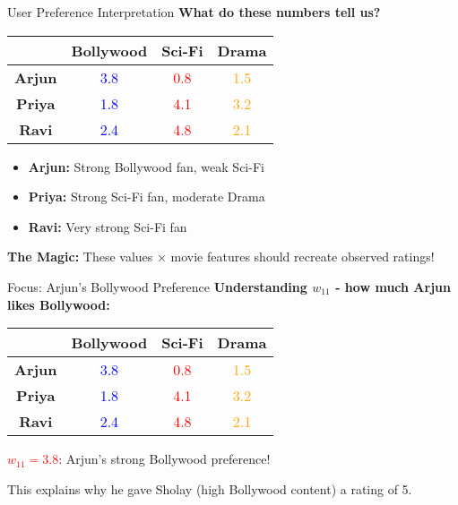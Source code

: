 \documentclass{beamer}
\begin{document}
\begin{frame}{User Preference Interpretation}
\textbf{What do these numbers tell us?}

\pause
\begin{center}
\renewcommand{\arraystretch}{1.6}
\begin{tabular}{c|ccc}
 & \textbf{Bollywood} & \textbf{Sci-Fi} & \textbf{Drama} \\
\hline
\textbf{Arjun} & \textcolor{blue}{3.8} & \textcolor{red}{0.8} & \textcolor{orange}{1.5} \\
\textbf{Priya} & \textcolor{blue}{1.8} & \textcolor{red}{4.1} & \textcolor{orange}{3.2} \\
\textbf{Ravi} & \textcolor{blue}{2.4} & \textcolor{red}{4.8} & \textcolor{orange}{2.1}
\end{tabular}
\end{center}

\pause
\begin{itemize}[<+->]
    \item \textbf{Arjun:} Strong Bollywood fan, weak Sci-Fi
    \item \textbf{Priya:} Strong Sci-Fi fan, moderate Drama
    \item \textbf{Ravi:} Very strong Sci-Fi fan
\end{itemize}

\pause
\textbf{The Magic:} These values × movie features should recreate observed ratings!
\end{frame}

\begin{frame}{Focus: Arjun's Bollywood Preference}
\textbf{Understanding $w_{11}$ - how much Arjun likes Bollywood:}

\pause
\begin{center}
\renewcommand{\arraystretch}{1.6}
\begin{tabular}{c|ccc}
 & \textbf{Bollywood} & \textbf{Sci-Fi} & \textbf{Drama} \\
\hline
\textbf{Arjun} & \cellcolor{red!50}\textcolor{blue}{3.8} & \textcolor{red}{0.8} & \textcolor{orange}{1.5} \\
\textbf{Priya} & \textcolor{blue}{1.8} & \textcolor{red}{4.1} & \textcolor{orange}{3.2} \\
\textbf{Ravi} & \textcolor{blue}{2.4} & \textcolor{red}{4.8} & \textcolor{orange}{2.1}
\end{tabular}
\end{center}

\pause
\textcolor{red}{\textbf{$w_{11} = 3.8$}}: Arjun's strong Bollywood preference!

\pause
This explains why he gave Sholay (high Bollywood content) a rating of 5.
\end{frame}
\end{document}
